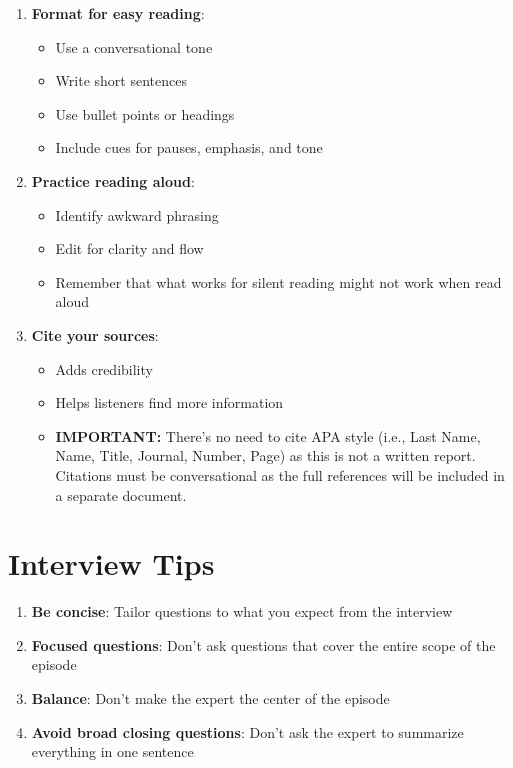 \documentclass[
  letterpaper,
  DIV=11,
  numbers=noendperiod]{scrreprt}
\providecommand{\tightlist}{%
  \setlength{\itemsep}{0pt}\setlength{\parskip}{0pt}}\usepackage{longtable,booktabs,array}
\begin{document}
\begin{enumerate}
\def\labelenumi{\arabic{enumi}.}
\tightlist
\item
  \textbf{Format for easy reading}:

  \begin{itemize}
  \tightlist
  \item
    Use a conversational tone
  \item
    Write short sentences
  \item
    Use bullet points or headings
  \item
    Include cues for pauses, emphasis, and tone
  \end{itemize}
\item
  \textbf{Practice reading aloud}:

  \begin{itemize}
  \tightlist
  \item
    Identify awkward phrasing
  \item
    Edit for clarity and flow
  \item
    Remember that what works for silent reading might not work when read
    aloud
  \end{itemize}
\item
  \textbf{Cite your sources}:

  \begin{itemize}
  \tightlist
  \item
    Adds credibility
  \item
    Helps listeners find more information
  \item
    \textbf{IMPORTANT:} There's no need to cite APA style (i.e., Last
    Name, Name, Title, Journal, Number, Page) as this is not a written
    report. Citations must be conversational as the full references will
    be included in a separate document.
  \end{itemize}
\end{enumerate}

\section{Interview Tips}\label{interview-tips}

\begin{enumerate}
\def\labelenumi{\arabic{enumi}.}
\tightlist
\item
  \textbf{Be concise}: Tailor questions to what you expect from the
  interview
\item
  \textbf{Focused questions}: Don't ask questions that cover the entire
  scope of the episode
\item
  \textbf{Balance}: Don't make the expert the center of the episode
\item
  \textbf{Avoid broad closing questions}: Don't ask the expert to
  summarize everything in one sentence
\end{enumerate}
\end{document}
